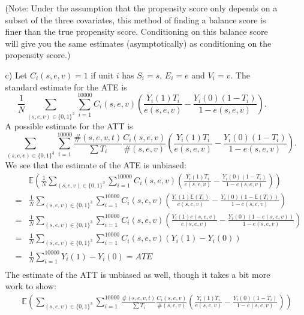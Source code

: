 \documentclass{article}
\def\E{{\mathbb E}}
\begin{document}
\begin{itemize}
\begin{itemize}
      (Note: Under the assumption that the propensity score only depends on a subset of
      the three covariates, this method of finding a balance
      score is finer than the true propensity score.  
      Conditioning on this balance score will give you the same estimates (asymptotically)
      as conditioning on the propensity score.)
    \item[c)]
      Let $C_i(s,e,v) = 1$ if unit $i$ has $S_i = s$, $E_i = e$ and $V_i = v$.
      The standard estimate for the ATE is
      $$
        \frac 1 N\sum_{(s,e,v) \in \{0,1\}^3}\sum_{i = 1}^{10000} C_{i}(s,e,v)\left(
          \frac{Y_i(1)T_i}{e(s,e,v)} - \frac{Y_i(0)(1-T_i)}{1- e(s,e,v)}
        \right).
      $$
      A possible estimate for the ATT is
      $$
       \sum_{(s,e,v) \in \{0,1\}^3}\sum_{i = 1}^{10000} \frac{\#(s,e,v,t)}{\sum T_i}\frac{C_{i}(s,e,v)}{\#(s,e,v)}\left(
          \frac{Y_i(1)T_i}{e(s,e,v)} - \frac{Y_i(0)(1-T_i)}{1- e(s,e,v)}
        \right).
      $$
      We see that the estimate of the ATE is unbiased:
      \begin{eqnarray*}
       && \E\left(\frac 1 N\sum_{(s,e,v) \in \{0,1\}^3}\sum_{i = 1}^{10000} C_{i}(s,e,v)\left(
          \frac{Y_i(1)T_i}{e(s,e,v)} - \frac{Y_i(0)(1-T_i)}{1- e(s,e,v)}
        \right)\right)\\
       &=&\frac 1 N\sum_{(s,e,v) \in \{0,1\}^3}\sum_{i = 1}^{10000} C_{i}(s,e,v)\left(
          \frac{Y_i(1)\E(T_i)}{e(s,e,v)} - \frac{Y_i(0)(1-\E(T_i))}{1- e(s,e,v)}
        \right)\\
      &=&\frac 1 N\sum_{(s,e,v) \in \{0,1\}^3}\sum_{i = 1}^{10000} C_{i}(s,e,v)\left(
          \frac{Y_i(1)e(s,e,v)}{e(s,e,v)} - \frac{Y_i(0)(1-e(s,e,v))}{1- e(s,e,v)}
        \right)\\
      &=&\frac 1 N\sum_{(s,e,v) \in \{0,1\}^3}\sum_{i = 1}^{10000} C_{i}(s,e,v)\left(
          Y_i(1) - Y_i(0)
        \right)\\
      & = &\frac 1 N\sum_{i = 1}^{10000}
          Y_i(1) - Y_i(0) = ATE\\
      \end{eqnarray*}
      The estimate of the ATT is unbiased as well, though it takes a bit more work to show:
      \begin{eqnarray*}
       &&\E\left(\sum_{(s,e,v) \in \{0,1\}^3}\sum_{i = 1}^{10000}
       \frac{\#(s,e,v,t)}{\sum T_i}\frac{C_{i}(s,e,v)}{\#(s,e,v)}
       \left(
          \frac{Y_i(1)T_i}{e(s,e,v)} - \frac{Y_i(0)(1-T_i)}{1- e(s,e,v)}
        \right)\right)\\

\end{eqnarray*}
\end{itemize}
\end{itemize}
\end{document}
